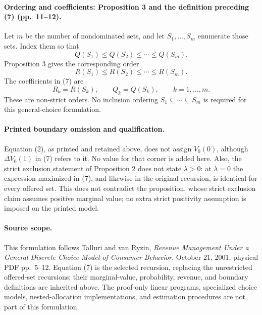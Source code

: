 \documentclass{article}
\begin{document}
\paragraph{Ordering and coefficients: Proposition 3 and the definition preceding (7) (pp.~11--12).}
Let $m$ be the number of nondominated sets, and let $S_1,\ldots,S_m$ enumerate those sets. Index them so that
\[
Q(S_1)\le Q(S_2)\le\cdots\le Q(S_m).
\]
Proposition 3 gives the corresponding order
\[
R(S_1)\le R(S_2)\le\cdots\le R(S_m).
\]
The coefficients in (7) are
\[
R_k=R(S_k),\qquad Q_k=Q(S_k),\qquad k=1,\ldots,m.
\]
These are non-strict orders. No inclusion ordering $S_1\subseteq\cdots\subseteq S_m$ is required for this general-choice formulation.

\paragraph{Printed boundary omission and qualification.}
Equation (2), as printed and retained above, does not assign $V_0(0)$, although $\Delta V_0(1)$ in (7) refers to it. No value for that corner is added here. Also, the strict exclusion statement of Proposition 2 does not state $\lambda>0$: at $\lambda=0$ the expression maximized in (7), and likewise in the original recursion, is identical for every offered set. This does not contradict the proposition, whose strict exclusion claim assumes positive marginal value; no extra strict positivity assumption is imposed on the printed model.

\paragraph{Source scope.}
This formulation follows Talluri and van Ryzin, \emph{Revenue Management Under a General Discrete Choice Model of Consumer Behavior}, October 21, 2001, physical PDF pp.~5--12. Equation (7) is the selected recursion, replacing the unrestricted offered-set recursions; their marginal-value, probability, revenue, and boundary definitions are inherited above. The proof-only linear programs, specialized choice models, nested-allocation implementations, and estimation procedures are not part of this formulation.
\end{document}
